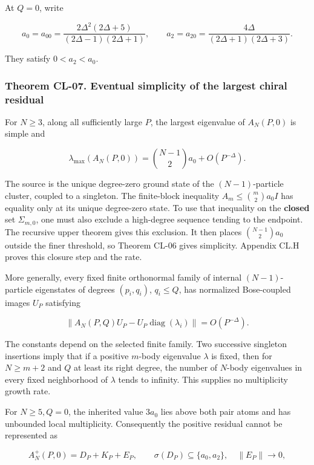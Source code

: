 At \(Q=0\), write

\[
a_0=a_{00}=\frac{2\Delta^2(2\Delta+5)}{(2\Delta-1)(2\Delta+1)},
\qquad
a_2=a_{20}=\frac{4\Delta}{(2\Delta+1)(2\Delta+3)}.
\]

They satisfy \(0<a_2<a_0\).

\hypertarget{theorem-cl-07.-eventual-simplicity-of-the-largest-chiral-residual}{%
\subsubsection{Theorem CL-07. Eventual simplicity of the largest chiral residual}\label{theorem-cl-07.-eventual-simplicity-of-the-largest-chiral-residual}}

For \(N\geq3\), along all sufficiently large \(P\), the largest eigenvalue of \(A_N(P,0)\) is simple and

\[
\lambda_{\max}(A_N(P,0))
=\binom{N-1}{2}a_0+O(P^{-\Delta}).
\tag{CL.20}
\]

The source is the unique degree-zero ground state of the \((N-1)\)-particle cluster, coupled to a singleton. The finite-block inequality \(A_m\leq\binom m2a_0I\) has equality only at its unique degree-zero state. To use that inequality on the \textbf{closed} set \(\Sigma_{m,0}\), one must also exclude a high-degree sequence tending to the endpoint. The recursive upper theorem gives this exclusion. It then places \(\binom{N-1}{2}a_0\) outside the finer threshold, so Theorem CL-06 gives simplicity. Appendix CL.H proves this closure step and the rate.

More generally, every fixed finite orthonormal family of internal \((N-1)\)-particle eigenstates of degrees \((p_i,q_i)\), \(q_i\leq Q\), has normalized Bose-coupled images \(U_P\) satisfying

\[
\|A_N(P,Q)U_P-U_P\operatorname{diag}(\lambda_i)\|
=O(P^{-\Delta}).
\tag{CL.21}
\]

The constants depend on the selected finite family. Two successive singleton insertions imply that if a positive \(m\)-body eigenvalue \(\lambda\) is fixed, then for \(N\geq m+2\) and \(Q\) at least its right degree, the number of \(N\)-body eigenvalues in every fixed neighborhood of \(\lambda\) tends to infinity. This supplies no multiplicity growth rate.

For \(N\geq5,Q=0\), the inherited value \(3a_0\) lies above both pair atoms and has unbounded local multiplicity. Consequently the positive residual cannot be represented as

\[
A_N^+(P,0)=D_P+K_P+E_P,
\qquad \sigma(D_P)\subseteq\{a_0,a_2\},\quad\|E_P\|\to0,
\tag{CL.22}
\]

